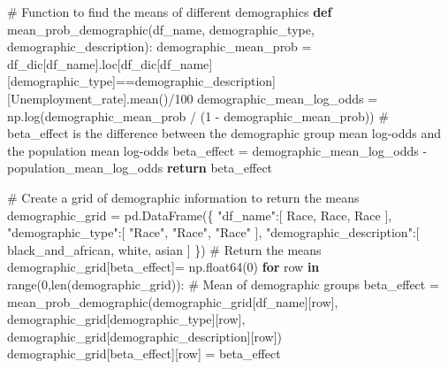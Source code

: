 \documentclass[
]{agujournal2019}
\newenvironment{Shaded}{\begin{snugshade}}{\end{snugshade}}
\newcommand{\BuiltInTok}[1]{\textcolor[rgb]{0.00,0.23,0.31}{#1}}
\newcommand{\CommentTok}[1]{\textcolor[rgb]{0.37,0.37,0.37}{#1}}
\newcommand{\ControlFlowTok}[1]{\textcolor[rgb]{0.00,0.23,0.31}{\textbf{#1}}}
\newcommand{\DecValTok}[1]{\textcolor[rgb]{0.68,0.00,0.00}{#1}}
\newcommand{\KeywordTok}[1]{\textcolor[rgb]{0.00,0.23,0.31}{\textbf{#1}}}
\newcommand{\NormalTok}[1]{\textcolor[rgb]{0.00,0.23,0.31}{#1}}
\newcommand{\OperatorTok}[1]{\textcolor[rgb]{0.37,0.37,0.37}{#1}}
\newcommand{\StringTok}[1]{\textcolor[rgb]{0.13,0.47,0.30}{#1}}
\begin{document}
\begin{Shaded}
\begin{Highlighting}[]
\CommentTok{\# Function to find the means of different demographics}
\KeywordTok{def}\NormalTok{ mean\_prob\_demographic(df\_name, demographic\_type, demographic\_description):}
\NormalTok{    demographic\_mean\_prob }\OperatorTok{=}\NormalTok{ df\_dic[df\_name].loc[df\_dic[df\_name][demographic\_type]}\OperatorTok{==}\NormalTok{demographic\_description][}\StringTok{\textquotesingle{}Unemployment\_rate\textquotesingle{}}\NormalTok{].mean()}\OperatorTok{/}\DecValTok{100}
\NormalTok{    demographic\_mean\_log\_odds }\OperatorTok{=}\NormalTok{ np.log(demographic\_mean\_prob }\OperatorTok{/}\NormalTok{ (}\DecValTok{1} \OperatorTok{{-}}\NormalTok{ demographic\_mean\_prob))}
    \CommentTok{\# beta\_effect is the difference between the demographic group mean log{-}odds and the population mean log{-}odds}
\NormalTok{    beta\_effect }\OperatorTok{=}\NormalTok{ demographic\_mean\_log\_odds }\OperatorTok{{-}}\NormalTok{ population\_mean\_log\_odds}
    \ControlFlowTok{return}\NormalTok{ beta\_effect}

\CommentTok{\# Create a grid of demographic information to return the means}
\NormalTok{demographic\_grid }\OperatorTok{=}\NormalTok{ pd.DataFrame(\{}
    \StringTok{"df\_name"}\NormalTok{:[}
        \StringTok{\textquotesingle{}Race\textquotesingle{}}\NormalTok{,}
        \StringTok{\textquotesingle{}Race\textquotesingle{}}\NormalTok{,}
        \StringTok{\textquotesingle{}Race\textquotesingle{}}
\NormalTok{    ],}
    \StringTok{"demographic\_type"}\NormalTok{:[}
        \StringTok{"Race"}\NormalTok{, }
        \StringTok{"Race"}\NormalTok{,}
        \StringTok{"Race"}
\NormalTok{    ],}
    \StringTok{"demographic\_description"}\NormalTok{:[}
        \StringTok{\textquotesingle{}black\_and\_african\textquotesingle{}}\NormalTok{,}
        \StringTok{\textquotesingle{}white\textquotesingle{}}\NormalTok{,}
        \StringTok{\textquotesingle{}asian\textquotesingle{}}
\NormalTok{    ]}
\NormalTok{\})}
\CommentTok{\# Return the means}
\NormalTok{demographic\_grid[}\StringTok{\textquotesingle{}beta\_effect\textquotesingle{}}\NormalTok{]}\OperatorTok{=}\NormalTok{ np.float64(}\DecValTok{0}\NormalTok{)}
\ControlFlowTok{for}\NormalTok{ row }\KeywordTok{in} \BuiltInTok{range}\NormalTok{(}\DecValTok{0}\NormalTok{,}\BuiltInTok{len}\NormalTok{(demographic\_grid)):}
    \CommentTok{\# Mean of demographic groups}
\NormalTok{    beta\_effect }\OperatorTok{=}\NormalTok{ mean\_prob\_demographic(demographic\_grid[}\StringTok{\textquotesingle{}df\_name\textquotesingle{}}\NormalTok{][row], demographic\_grid[}\StringTok{\textquotesingle{}demographic\_type\textquotesingle{}}\NormalTok{][row], demographic\_grid[}\StringTok{\textquotesingle{}demographic\_description\textquotesingle{}}\NormalTok{][row])}
\NormalTok{    demographic\_grid[}\StringTok{\textquotesingle{}beta\_effect\textquotesingle{}}\NormalTok{][row] }\OperatorTok{=}\NormalTok{ beta\_effect}
\end{Highlighting}
\end{Shaded}
\end{document}
